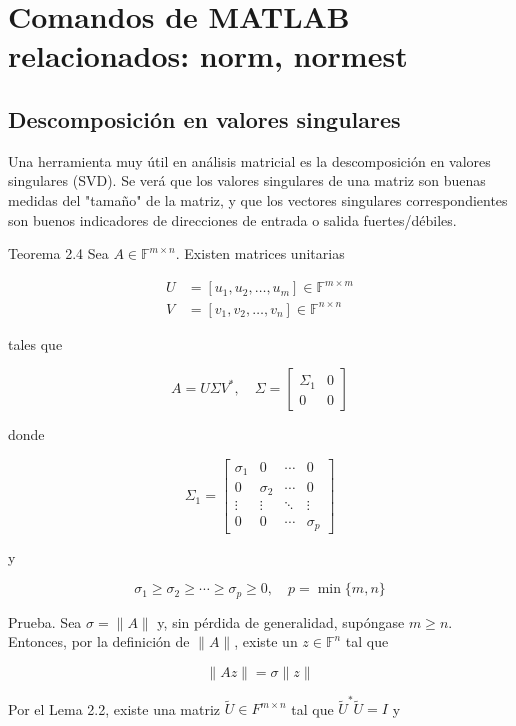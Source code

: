 \documentclass[11pt]{article}
\begin{document}
\section*{Comandos de MATLAB relacionados: norm, normest}

\subsection*{Descomposición en valores singulares}
Una herramienta muy útil en análisis matricial es la descomposición en valores singulares (SVD). Se verá que los valores singulares de una matriz son buenas medidas del "tamaño" de la matriz, y que los vectores singulares correspondientes son buenos indicadores de direcciones de entrada o salida fuertes/débiles.

Teorema 2.4 Sea $A \in \mathbb{F}^{m \times n}$. Existen matrices unitarias

$$
\begin{aligned}
U & =\left[u_{1}, u_{2}, \ldots, u_{m}\right] \in \mathbb{F}^{m \times m} \\
V & =\left[v_{1}, v_{2}, \ldots, v_{n}\right] \in \mathbb{F}^{n \times n}
\end{aligned}
$$

tales que

$$
A=U \Sigma V^{*}, \quad \Sigma=\left[\begin{array}{cc}
\Sigma_{1} & 0 \\
0 & 0
\end{array}\right]
$$

donde

$$
\Sigma_{1}=\left[\begin{array}{cccc}
\sigma_{1} & 0 & \cdots & 0 \\
0 & \sigma_{2} & \cdots & 0 \\
\vdots & \vdots & \ddots & \vdots \\
0 & 0 & \cdots & \sigma_{p}
\end{array}\right]
$$

y

$$
\sigma_{1} \geq \sigma_{2} \geq \cdots \geq \sigma_{p} \geq 0, \quad p=\min \{m, n\}
$$

Prueba. Sea $\sigma=\|A\|$ y, sin pérdida de generalidad, supóngase $m \geq n$. Entonces, por la definición de $\|A\|$, existe un $z \in \mathbb{F}^{n}$ tal que

$$
\|A z\|=\sigma\|z\|
$$

Por el Lema 2.2, existe una matriz $\tilde{U} \in F^{m \times n}$ tal que $\tilde{U}^{*} \tilde{U}=I$ y
\end{document}
